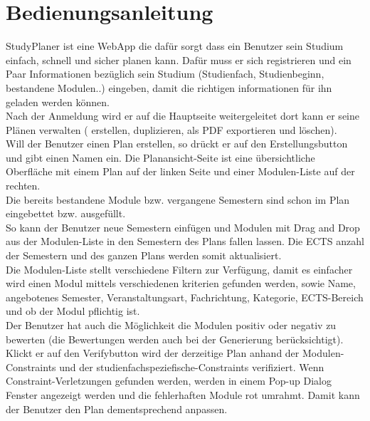 \section{Bedienungsanleitung}

StudyPlaner ist eine WebApp die dafür sorgt dass ein Benutzer sein Studium einfach, schnell und sicher planen kann. Dafür muss er sich registrieren und ein Paar Informationen bezüglich sein Studium (Studienfach, Studienbeginn, bestandene Modulen..) eingeben, damit die richtigen informationen für ihn geladen werden können. \\

Nach der Anmeldung wird er auf die Hauptseite weitergeleitet dort kann er seine Plänen verwalten ( erstellen, duplizieren, als PDF exportieren und löschen). \\

Will der Benutzer einen Plan erstellen, so drückt er auf den Erstellungsbutton und gibt einen Namen ein. Die Planansicht-Seite ist eine übersichtliche Oberfläche mit einem Plan auf der linken Seite und einer Modulen-Liste auf der rechten.\\

Die bereits bestandene Module bzw. vergangene Semestern sind schon im Plan eingebettet bzw. ausgefüllt.\\
So kann der Benutzer neue Semestern einfügen und Modulen mit Drag and Drop aus der Modulen-Liste in den Semestern des Plans fallen lassen. Die ECTS anzahl der Semestern und des ganzen Plans werden somit aktualisiert. \\

Die Modulen-Liste stellt verschiedene Filtern zur Verfügung, damit es einfacher wird einen Modul mittels verschiedenen kriterien gefunden werden, sowie Name, angebotenes Semester,  Veranstaltungsart, Fachrichtung, Kategorie, ECTS-Bereich und ob der Modul pflichtig ist.\\

Der Benutzer hat auch die Möglichkeit die Modulen positiv oder negativ zu bewerten (die Bewertungen werden auch bei der Generierung berücksichtigt).\\
Klickt er auf den Verifybutton wird der derzeitige Plan anhand der Modulen-Constraints und der studienfachspeziefische-Constraints verifiziert. Wenn Constraint-Verletzungen gefunden werden, werden in einem Pop-up Dialog Fenster angezeigt werden und die fehlerhaften Module rot umrahmt. Damit kann der Benutzer den Plan dementsprechend anpassen.\\

